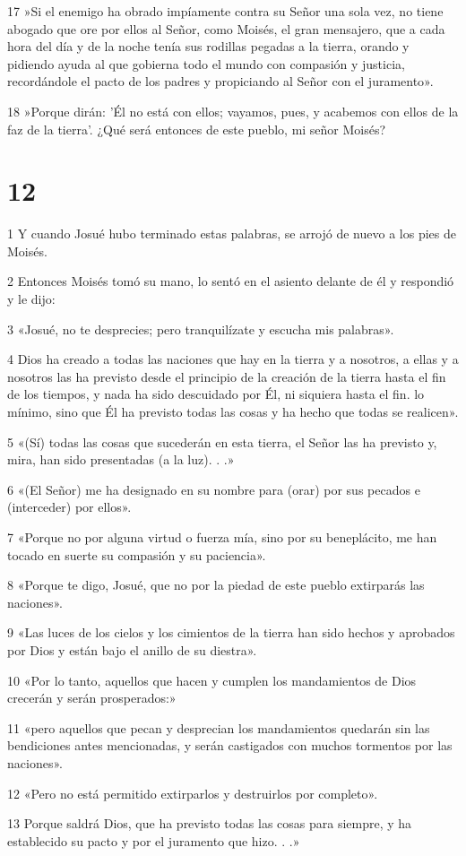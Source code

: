 \par 17 »Si el enemigo ha obrado impíamente contra su Señor una sola vez, no tiene abogado que ore por ellos al Señor, como Moisés, el gran mensajero, que a cada hora del día y de la noche tenía sus rodillas pegadas a la tierra, orando y pidiendo ayuda al que gobierna todo el mundo con compasión y justicia, recordándole el pacto de los padres y propiciando al Señor con el juramento».
\par 18 »Porque dirán: 'Él no está con ellos; vayamos, pues, y acabemos con ellos de la faz de la tierra'. ¿Qué será entonces de este pueblo, mi señor Moisés?

\chapter{12}

\par 1 Y cuando Josué hubo terminado estas palabras, se arrojó de nuevo a los pies de Moisés.
\par 2 Entonces Moisés tomó su mano, lo sentó en el asiento delante de él y respondió y le dijo:
\par 3 «Josué, no te desprecies; pero tranquilízate y escucha mis palabras».
\par 4 Dios ha creado a todas las naciones que hay en la tierra y a nosotros, a ellas y a nosotros las ha previsto desde el principio de la creación de la tierra hasta el fin de los tiempos, y nada ha sido descuidado por Él, ni siquiera hasta el fin. lo mínimo, sino que Él ha previsto todas las cosas y ha hecho que todas se realicen».
\par 5 «(Sí) todas las cosas que sucederán en esta tierra, el Señor las ha previsto y, mira, han sido presentadas (a la luz). . .»
\par 6 «(El Señor) me ha designado en su nombre para (orar) por sus pecados e (interceder) por ellos».
\par 7 «Porque no por alguna virtud o fuerza mía, sino por su beneplácito, me han tocado en suerte su compasión y su paciencia».
\par 8 «Porque te digo, Josué, que no por la piedad de este pueblo extirparás las naciones».
\par 9 «Las luces de los cielos y los cimientos de la tierra han sido hechos y aprobados por Dios y están bajo el anillo de su diestra».
\par 10 «Por lo tanto, aquellos que hacen y cumplen los mandamientos de Dios crecerán y serán prosperados:»
\par 11 «pero aquellos que pecan y desprecian los mandamientos quedarán sin las bendiciones antes mencionadas, y serán castigados con muchos tormentos por las naciones».
\par 12 «Pero no está permitido extirparlos y destruirlos por completo».
\par 13 Porque saldrá Dios, que ha previsto todas las cosas para siempre, y ha establecido su pacto y por el juramento que hizo. . .»

